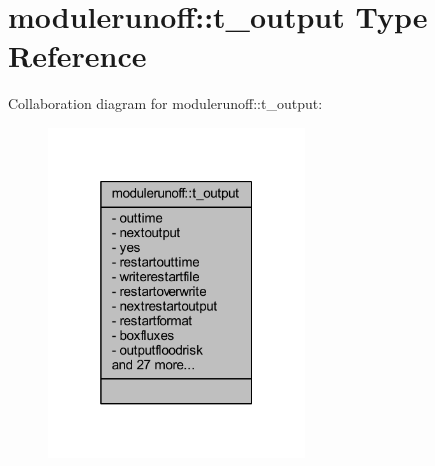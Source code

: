 \hypertarget{structmodulerunoff_1_1t__output}{}\section{modulerunoff\+:\+:t\+\_\+output Type Reference}
\label{structmodulerunoff_1_1t__output}


Collaboration diagram for modulerunoff\+:\+:t\+\_\+output\+:\nopagebreak
\begin{figure}[H]
\begin{center}
\leavevmode
\includegraphics[width=193pt]{structmodulerunoff_1_1t__output__coll__graph}
\end{center}
\end{figure}
